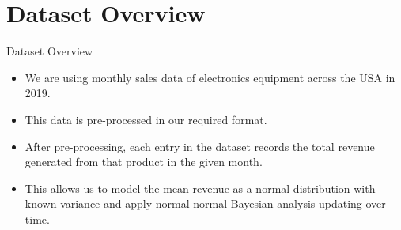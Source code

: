 \section{Dataset Overview}

\begin{frame}{Dataset Overview}

  \begin{itemize}

    \item We are using monthly sales data of electronics equipment across the USA in 2019.
    \item This data is pre-processed in our required format.
    \item After pre-processing, each entry in the dataset records the total revenue generated from that product in the given month.
    \item This allows us to model the mean revenue as a normal distribution with known variance and apply normal-normal Bayesian analysis updating over time.
  \end{itemize}
  
\end{frame}
